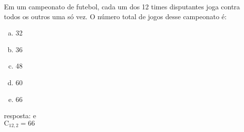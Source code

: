 \begin{ex}
 Em um campeonato de futebol, cada um dos 12 times disputantes joga contra todos os outros uma só vez. O número total de jogos desse campeonato é:
    \begin{enumerate}[(a)]
    \item 32
    \item 36
    \item 48
    \item 60
    \item 66
    \end{enumerate}
       \begin{sol}
         resposta: e \\
         $\mathrm{C}_{{12},2}=66$
       \end{sol}
\end{ex}